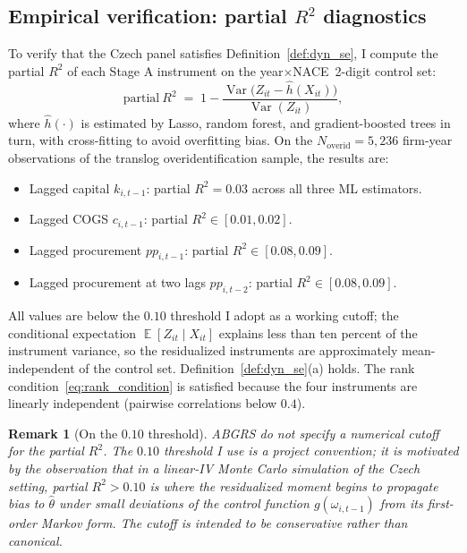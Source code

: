 \documentclass[11pt]{article}
\newtheorem{remark}{Remark}
\DeclareMathOperator{\E}{\mathbb{E}}
\DeclareMathOperator{\Var}{Var}
\begin{document}
\subsection{Empirical verification: partial $R^2$ diagnostics}

To verify that the Czech panel satisfies Definition~\ref{def:dyn_se}, I compute the partial $R^2$ of each Stage A instrument on the year$\times$NACE~2-digit control set:
\begin{equation}\label{eq:partial_r2}
\mathrm{partial}\ R^2 \;=\; 1 - \frac{\Var\bigl(Z_{it} - \hat h(X_{it})\bigr)}{\Var(Z_{it})},
\end{equation}
where $\hat h(\cdot)$ is estimated by Lasso, random forest, and gradient-boosted trees in turn, with cross-fitting to avoid overfitting bias. On the $N_{\text{overid}}=5{,}236$ firm-year observations of the translog overidentification sample, the results are:
\begin{itemize}
\item Lagged capital $k_{i,t-1}$: partial $R^2 = 0.03$ across all three ML estimators.
\item Lagged COGS $c_{i,t-1}$: partial $R^2 \in [0.01, 0.02]$.
\item Lagged procurement $pp_{i,t-1}$: partial $R^2 \in [0.08, 0.09]$.
\item Lagged procurement at two lags $pp_{i,t-2}$: partial $R^2 \in [0.08, 0.09]$.
\end{itemize}
All values are below the $0.10$ threshold I adopt as a working cutoff; the conditional expectation $\E[Z_{it}\mid X_{it}]$ explains less than ten percent of the instrument variance, so the residualized instruments are approximately mean-independent of the control set. Definition~\ref{def:dyn_se}(a) holds. The rank condition~\eqref{eq:rank_condition} is satisfied because the four instruments are linearly independent (pairwise correlations below $0.4$).

\begin{remark}[On the $0.10$ threshold]\label{rem:threshold}
ABGRS do not specify a numerical cutoff for the partial $R^2$. The $0.10$ threshold I use is a project convention; it is motivated by the observation that in a linear-IV Monte Carlo simulation of the Czech setting, partial $R^2 > 0.10$ is where the residualized moment begins to propagate bias to $\hat\theta$ under small deviations of the control function $g(\omega_{i,t-1})$ from its first-order Markov form. The cutoff is intended to be conservative rather than canonical.
\end{remark}
\end{document}
